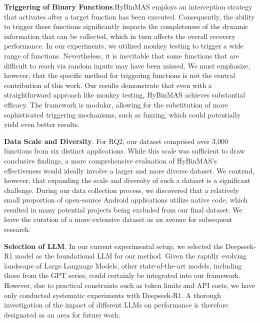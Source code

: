 \documentclass[acmsmall,screen,review,anonymous]{acmart} %
\begin{document}
\textbf{Triggering of Binary Functions}.HyBinMAS employs an interception strategy that activates after a target function has been executed. Consequently, the ability to trigger these functions significantly impacts the completeness of the dynamic information that can be collected, which in turn affects the overall recovery performance. In our experiments, we utilized monkey testing to trigger a wide range of functions. Nevertheless, it is inevitable that some functions that are difficult to reach via random inputs may have been missed. We must emphasize, however, that the specific method for triggering functions is not the central contribution of this work. Our results demonstrate that even with a straightforward approach like monkey testing, HyBinMAS achieves substantial efficacy. The framework is modular, allowing for the substitution of more sophisticated triggering mechanisms, such as fuzzing, which could potentially yield even better results.

\textbf{Data Scale and Diversity}. For RQ2, our dataset comprised over 3,000 functions from six distinct applications. While this scale was sufficient to draw conclusive findings, a more comprehensive evaluation of HyBinMAS's effectiveness would ideally involve a larger and more diverse dataset. We contend, however, that expanding the scale and diversity of such a dataset is a significant challenge. During our data collection process, we discovered that a relatively small proportion of open-source Android applications utilize native code, which resulted in many potential projects being excluded from our final dataset. We leave the curation of a more extensive dataset as an avenue for subsequent research.

\textbf{Selection of LLM}. In our current experimental setup, we selected the Deepseek-R1 model as the foundational LLM for our method. Given the rapidly evolving landscape of Large Language Models, other state-of-the-art models, including those from the GPT series, could certainly be integrated into our framework. However, due to practical constraints such as token limits and API costs, we have only conducted systematic experiments with Deepseek-R1. A thorough investigation of the impact of different LLMs on performance is therefore designated as an area for future work.



\end{document}

